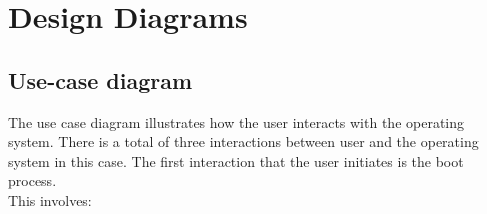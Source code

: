 \graphicspath{ {./diagrams/} }
\chapter{Design Diagrams}\label{chapter:Design Diagrams}

\section{Use-case diagram}

\begin{flushleft}
	The use case diagram illustrates how the user interacts with the operating system. There is a total of three interactions between user and the operating system in this case.
	The first interaction that the user initiates is the boot process.\\ 
	This involves:
\end{flushleft}


